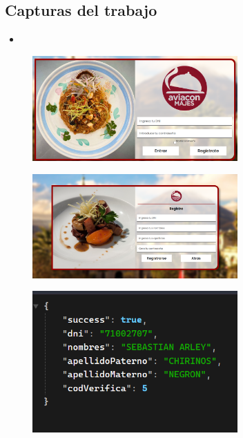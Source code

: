 \documentclass{article}
\begin{document}
\subsection{Capturas del trabajo}
	\begin{itemize}	
		\item 
	\end{itemize}	
	
	\begin{figure}[H]
		\centering
		\includegraphics[width=0.7\textwidth,keepaspectratio]{img/1.png}
	\end{figure}
	\begin{figure}[H]
		\centering
		\includegraphics[width=0.7\textwidth,keepaspectratio]{img/2.png}
	\end{figure}
	\begin{figure}[H]
		\centering
		\includegraphics[width=0.7\textwidth,keepaspectratio]{img/4.png}
	\end{figure}
\end{document}
